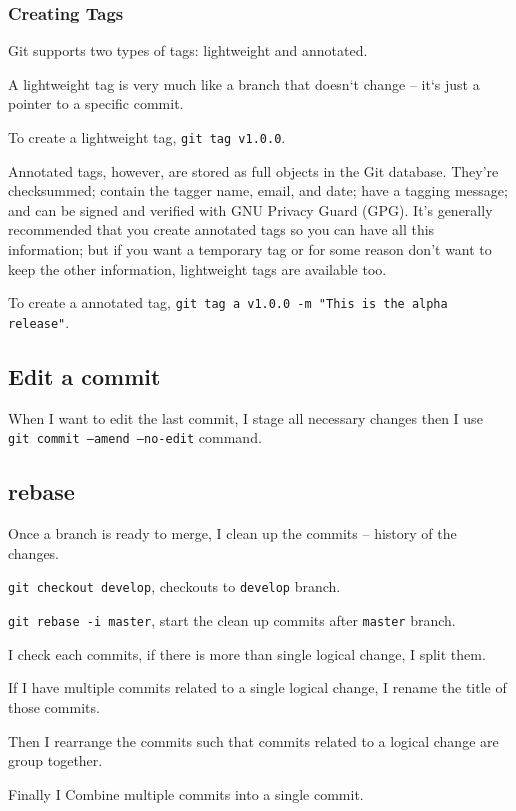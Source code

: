\subsubsection{Creating Tags}%
\label{ssub:subsubsection_name}


 Git supports two types of tags: lightweight and annotated.

 A lightweight tag is very much like a branch that doesn`t change -- it`s just a pointer to a specific commit.

 To create a lightweight tag, \texttt{git tag v1.0.0}.


 Annotated tags, however, are stored as full objects in the Git database. They’re checksummed; contain the tagger name, email, and date; have a tagging message; and can be signed and verified with GNU Privacy Guard (GPG). It’s generally recommended that you create annotated tags so you can have all this information; but if you want a temporary tag or for some reason don’t want to keep the other information, lightweight tags are available too.

 To create a annotated tag, \texttt{git tag a  v1.0.0 -m "This is the alpha release"}.

\subsection{Edit a commit}
When I want to edit the last commit, I stage all necessary changes then I use \texttt{ git commit --amend --no-edit} command.


\subsection{rebase} \label{git_rebase}
Once a branch is ready to merge, I clean up the commits -- history of the changes. 


\texttt{git checkout develop}, checkouts to \texttt{develop} branch.

\texttt{git rebase -i master}, start the clean up commits after \texttt{master} branch.

I check each commits, if there is more than single logical change, I split them.

If I have multiple commits related to a single logical change, I rename the title of those commits.

Then I rearrange the commits such that commits related to a logical change are group together.

Finally I Combine multiple commits into a single commit.


